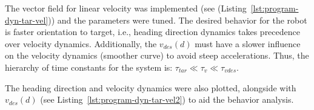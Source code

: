 The vector field for linear velocity was implemented (see
(Listing~\ref{lst:program-dyn-tar-vel})) and the parameters were tuned. 
The desired behavior for the robot is faster orientation to target, i.e.,
heading direction dynamics takes precedence over velocity
dynamics. Additionally, the $v_{des}(d)$ must have a slower influence on the
velocity dynamics (smoother curve) to avoid steep accelerations.
Thus, the hierarchy of time constants for the system is: $\tau_{tar} \ll \tau_{v}
\ll \tau_{vdes}$.
%

The heading direction and velocity dynamics were also plotted, alongside with
$v_{des}(d)$ (see Listing~\ref{lst:program-dyn-tar-vel2}) to aid the behavior analysis.
%

